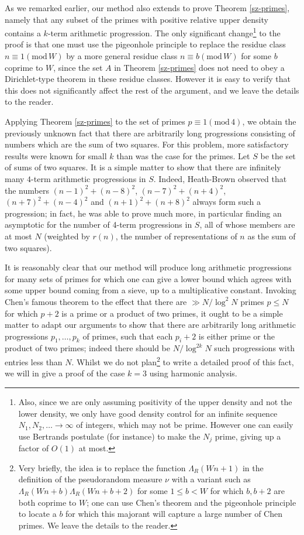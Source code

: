 \documentclass[12pt,a4paper,reqno]{amsart}
\numberwithin{equation}{section}
\theoremstyle{plain}
\theoremstyle{definition}
\renewcommand{\leq}{\leqslant}
\newcommand{\md}[1]{\ensuremath{(\mbox{mod}\, #1)}}
\def\vs{\vspace{11pt}}
\def\ni{\noindent}
\begin{document}
\ni As we remarked earlier, our method also extends to prove Theorem \ref{sz-primes}, namely that any subset of the primes with positive relative upper density contains a $k$-term arithmetic progression.   The only significant change\footnote{Also, since we are only assuming positivity of the upper density and not the lower density, we only have good density control for an infinite sequence $N_1, N_2, \ldots \to \infty$ of integers, which may not be prime.  However one can easily use Bertrands postulate (for instance) to make the $N_j$ prime, giving up a factor of $O(1)$ at most.} to the proof is that one must use the pigeonhole principle to replace the residue class $n \equiv 1 \md{W} $ by a more general 
residue class $n \equiv b \md{W}$ for some $b$ coprime
to $W$, since the set $A$ in Theorem \ref{sz-primes} does not need to obey a Dirichlet-type theorem in these residue classes.  However it is easy to verify 
that this does not significantly affect the rest of the argument, and we 
leave the details to the reader.\vs

\ni Applying Theorem \ref{sz-primes} to the set of primes $p \equiv 1 \md{4}$, we obtain the previously unknown fact that there are arbitrarily long progressions consisting of numbers which are the sum of two squares. For this problem, more satisfactory results were known for small $k$ than was the case for the primes. Let $S$ be the set of sums of two squares. It is a simple matter to show
that there are infinitely many $4$-term arithmetic progressions in $S$. Indeed, Heath-Brown \cite{heath-brown2} observed that the numbers $(n-1)^2 + (n-8)^2$, $(n - 7)^2 + (n + 4)^2$, $(n + 7)^2 + (n - 4)^2$ and $(n + 1)^2 + (n + 8)^2$ always form such a progression; in fact, he was able to prove much more, in particular finding an asymptotic for the number of 4-term progressions in $S$, all of whose members are at most $N$
(weighted by $r(n)$, the number of representations of $n$ as the sum of two squares).\vs

\ni It is reasonably clear that our method will produce long arithmetic progressions for many sets of primes for which one can give a lower bound which agrees with some upper bound coming from a sieve, up to a multiplicative constant. Invoking Chen's famous theorem\cite{Chen} to the effect that there are $\gg N/\log^2 N$ primes $p \leq N$ for which $p + 2$ is a prime or a product of two primes, it ought to be a simple matter to adapt our arguments to show that there are arbitrarily long arithmetic progressions $p_1,\dots,p_k$ of primes, such that each $p_i + 2$ is either prime or the product of two primes; indeed there should be $N / \log^{2k} N$ such progressions with entries less than $N$.  Whilst we do not plan\footnote{Very briefly, the idea is to replace the function $\Lambda_R(Wn+1)$ in the definition of the pseudorandom measure $\nu$ with a variant such as $\Lambda_R(Wn+b) \Lambda_R(Wn+b+2)$ for some $1 \leq b < W$ for which $b, b+2$ are both coprime to $W$; one can use Chen's theorem and the pigeonhole principle to locate a $b$ for which this majorant will capture a large number of Chen primes.  We leave the details to the reader.} to write a detailed proof of this fact, we will in \cite{green-tao} give a proof of the case $k = 3$ using harmonic analysis.\vs
\end{document}
